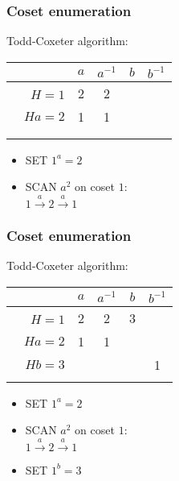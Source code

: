 \documentclass{beamer}
\begin{document}
\begin{frame}[t]
  \frametitle{Coset enumeration}
  Todd-Coxeter algorithm:
  \begin{table}
    \begin{tabular}{r | c c c c}
      & $a$ & $a^{-1}$ & $b$ & $b^{-1}$ \\ \hline
      $\phantom{b^{-1}}H=1$ & 2 & 2 & \phantom{3} & \\
      $Ha=2$ & 1 & 1 & & \\ \\ \\
    \end{tabular}
  \end{table}

  \begin{itemize}
  \item SET $1^a=2$  
  \item SCAN $a^2$ on coset $1$: \\ $1 \overset{a}{\rightarrow} 2 \overset{a}{\rightarrow} 1$
  \end{itemize}
\end{frame}

\begin{frame}[t]
  \frametitle{Coset enumeration}
  Todd-Coxeter algorithm:
  \begin{table}
    \begin{tabular}{r | c c c c}
      & $a$ & $a^{-1}$ & $b$ & $b^{-1}$ \\ \hline
      $\phantom{b^{-1}}H=1$  & 2 & 2 & 3 &   \\
      $Ha=2$ & 1 & 1 &   &   \\
      $Hb=3$ &   &   &   & 1 \\ \\
    \end{tabular}
  \end{table}

  \begin{itemize}
  \item SET $1^a=2$  
  \item SCAN $a^2$ on coset $1$: \\ $ 1 \overset{a}{\rightarrow} 2 \overset{a}{\rightarrow} 1$
  \item SET $1^b = 3$
  \end{itemize}
\end{frame}
\end{document}
